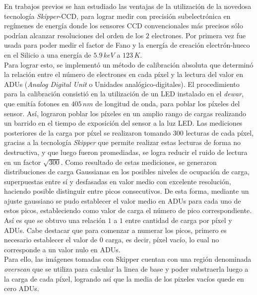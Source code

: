 \noindent En trabajos previos se han estudiado las ventajas de la utilización de la novedosa tecnología \textit{Skipper}-CCD, para lograr medir con precisión subelectrónica en regímenes de energía donde los sensores CCD convencionales más precisos sólo podrían alcanzar resoluciones del orden de los $2$ electrones. Por primera vez fue usada para poder medir el factor de Fano y la energía de creación electrón-hueco en el Silicio a una energía de $5.9\,\si{keV}$ a $123\,\si{K}$\cite{Rodrigues}.\\
\indent Para lograr esto, se implementó un método de calibración absoluta que determinó la relación entre el número de electrones en cada píxel y la lectura del valor en ADUs (\textit{Analog Digital Unit} o Unidades analógico-digitales). El procedimiento para la calibración consistió en la utilización de un LED instalado en el \textit{dewar}, que emitía fotones en $405\,\si{nm}$ de longitud de onda, para poblar los píxeles del sensor. Así, lograron poblar los píxeles en un amplio rango de cargas realizando un barrido en el tiempo de exposición del sensor a la luz LED. Las mediciones posteriores de la carga por píxel se realizaron tomando $300$ lecturas de cada píxel, gracias a la tecnología \textit{Skipper} que permite realizar estas lecturas de forma no destructiva, y que luego fueron promediadas, se logra reducir el ruido de lectura en un factor $\sqrt{300}$. Como resultado de estas mediciones, se generaron distribuciones de carga Gaussianas en los posibles niveles de ocupación de carga, superpuestas entre sí y desfasadas en valor medio con excelente resolución, haciendo posible distinguir entre picos consecutivos. De esta forma, mediante un ajuste gaussiano se pudo establecer el valor medio en ADUs para cada uno de estos picos, estableciendo como valor de carga el número de pico correspondiente. Así es que se obtuvo una relación $1$ a $1$ entre cantidad de carga por píxel y ADUs. Cabe destacar que para comenzar a numerar los picos, primero es necesario establecer el valor de $0$ carga, es decir, píxel vacío, lo cual no corresponde a un valor nulo en ADUs.\\
Para ello, las imágenes tomadas con Skipper cuentan con una región denominada \textit{overscan} que se utiliza para calcular la linea de base y poder substraerla luego a la carga de cada píxel, logrando así que la media de los pixeles vacíos quede en cero ADUs.

